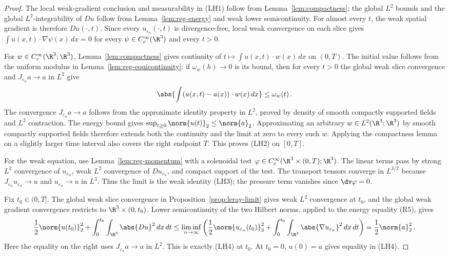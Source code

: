 \documentclass[11pt,reqno]{amsart}
\begin{document}
\begin{proof}
The local weak-gradient conclusion and measurability in (LH1) follow from
Lemma~\ref{lem:compactness}; the global $L^2$ bounds and the global
$L^2$-integrability of $Du$ follow from Lemma~\ref{lem:reg-energy} and
weak lower semicontinuity. For almost every $t$, the weak spatial gradient
is therefore $Du(\cdot,t)$. Since every $u_{\varepsilon_n}(\cdot,t)$ is
divergence-free, local weak convergence on each slice gives
$\int u(x,t)\cdot\nabla\psi(x)\,dx=0$ for every $\psi\in C_c^\infty(\R^3)$
and every $t>0$.

For $w\in C_c^\infty(\R^3;\R^3)$, Lemma~\ref{lem:compactness} gives
continuity of $t\mapsto\int u(x,t)\cdot w(x)\,dx$ on $(0,T)$. The
initial value follows from the uniform modulus in
Lemma~\ref{lem:reg-equicontinuity}: if $\omega_w(h)\to0$ is its bound,
then for every $t>0$ the global weak slice convergence and
$J_{\varepsilon_n}a\to a$ in $L^2$ give
\begin{equation}\label{eq:leray-weak-initial}
 \abs{\int (u(x,t)-a(x))\cdot w(x)\,dx}\le\omega_w(t)\,.
\end{equation}
The convergence $J_{\varepsilon_n}a\to a$ follows from the approximate
identity property in $L^2$, proved by density of smooth compactly supported
fields and $L^2$ contraction. The energy bound gives
$\sup_{t\ge0}
\norm{u(t)}_2\le
\norm{a}_2$. Approximating an arbitrary
$w\in L^2(\R^3;\R^3)$ by smooth compactly supported fields therefore
extends both the continuity and the limit at zero to every such $w$.
Applying the compactness lemma on a slightly larger time interval also
covers the right endpoint $T$. This proves (LH2) on $[0,T]$.

For the weak equation, use Lemma~\ref{lem:reg-momentum} with a
solenoidal test $\varphi\in C_c^\infty(\R^3\times(0,T);\R^3)$. The linear
terms pass by strong $L^2$ convergence of $u_{\varepsilon_n}$, weak $L^2$
convergence of $Du_{\varepsilon_n}$, and compact support of the test. The
transport tensors converge in $L^{3/2}$ because
$J_{\varepsilon_n}u_{\varepsilon_n}\to u$ and
$u_{\varepsilon_n}\to u$ in $L^3$. Thus the limit is the weak identity
(LH3); the pressure term vanishes since $\dv\varphi=0$.

Fix $t_0\in(0,T]$. The global weak slice convergence in
Proposition~\ref{prop:leray-limit} gives weak $L^2$ convergence at $t_0$,
and the global weak gradient convergence restricts to
$\R^3\times(0,t_0)$. Lower semicontinuity of the two Hilbert norms, applied
to the energy equality (R5), gives
\begin{equation}\label{eq:leray-energy-limit}
 \frac12\norm{u(t_0)}_2^2+\int_0^{t_0}\int_{\R^3}\abs{Du}^2\,dx\,dt
 \le\liminf_{n\to\infty}\left(
 \frac12\norm{u_{\varepsilon_n}(t_0)}_2^2
 +\int_0^{t_0}\int_{\R^3}\abs{\nabla u_{\varepsilon_n}}^2\,dx\,dt\right)
 =\frac12\norm{a}_2^2\,.
\end{equation}
Here the equality on the right uses $J_{\varepsilon_n}a\to a$ in $L^2$.
This is exactly (LH4) at $t_0$. At $t_0=0$, $u(0)=a$ gives equality in
(LH4).


\end{proof}
\end{document}
